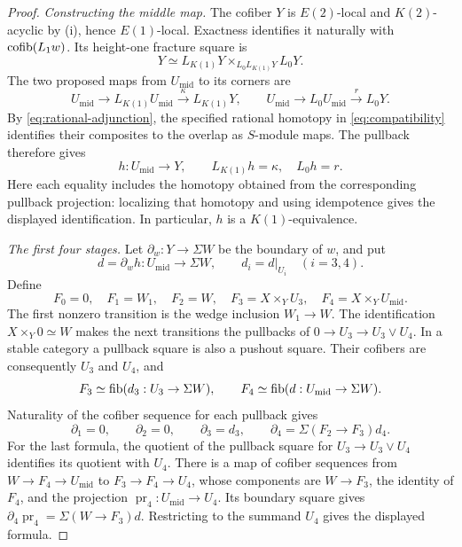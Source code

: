 \begin{proof}
\emph{Constructing the middle map.}
The cofiber \(Y\) is \(E(2)\)-local and \(K(2)\)-acyclic by
\textup{(i)}, hence \(E(1)\)-local.  Exactness identifies it
naturally with \(\operatorname{cofib}(L_1w)\).  Its height-one fracture square is
\[
 Y\simeq L_{K(1)}Y\mathbin{\times}_{L_0L_{K(1)}Y}L_0Y.
\]
The two proposed maps from \(U_{\mathrm{mid}}\) to its corners are
\[
 U_{\mathrm{mid}}\longrightarrow L_{K(1)}U_{\mathrm{mid}}\xrightarrow{\kappa}L_{K(1)}Y,
 \qquad
 U_{\mathrm{mid}}\longrightarrow L_0U_{\mathrm{mid}}\xrightarrow rL_0Y.
\]
By \eqref{eq:rational-adjunction}, the specified rational homotopy
in \eqref{eq:compatibility} identifies their composites to the
overlap as \(S\)-module maps.  The pullback therefore gives
\begin{equation}\label{eq:middle-map}
 h:U_{\mathrm{mid}}\longrightarrow Y,\qquad L_{K(1)}h=\kappa,\quad L_0h=r.
\end{equation}
Here each equality includes the homotopy obtained from the
corresponding pullback projection: localizing that homotopy and
using idempotence gives the displayed identification.  In
particular, \(h\) is a \(K(1)\)-equivalence.

\emph{The first four stages.}
Let \(\partial_w:Y\to\Sigma W\) be the boundary of \(w\), and put
\[
 d=\partial_wh:U_{\mathrm{mid}}\longrightarrow\Sigma W,\qquad
 d_i=d|_{U_i}\quad(i=3,4).
\]
Define
\begin{equation}\label{eq:first-stages}
 F_0=0,\quad F_1=W_1,\quad F_2=W,\quad
 F_3=X\mathbin{\times}_YU_3,\quad
 F_4=X\mathbin{\times}_YU_{\mathrm{mid}}.
\end{equation}
The first nonzero transition is the wedge inclusion \(W_1\to W\).
The identification \(X\times_Y0\simeq W\) makes the next transitions
the pullbacks of \(0\to U_3\to U_3\vee U_4\).
In a stable category a pullback square is also a pushout square.
Their cofibers are consequently \(U_3\) and \(U_4\), and
\[
 F_3\simeq\operatorname{fib}(d_3:U_3\to\Sigma W),\qquad
 F_4\simeq\operatorname{fib}(d:U_{\mathrm{mid}}\to\Sigma W).
\]
Naturality of the cofiber sequence for each pullback gives
\begin{equation}\label{eq:first-boundaries}
 \partial_1=0,\qquad \partial_2=0,\qquad
 \partial_3=d_3,\qquad
 \partial_4=\Sigma(F_2\to F_3)d_4.
\end{equation}
For the last formula, the quotient of the pullback square for
\(U_3\to U_3\vee U_4\) identifies its quotient with \(U_4\).
There is a map of cofiber sequences from
\(W\to F_4\to U_{\mathrm{mid}}\) to
\(F_3\to F_4\to U_4\), whose components are
\(W\to F_3\), the identity of \(F_4\), and the projection
\(\operatorname{pr}_4:U_{\mathrm{mid}}\to U_4\).
Its boundary square gives
\(\partial_4\operatorname{pr}_4=\Sigma(W\to F_3)d\).
Restricting to the summand \(U_4\) gives the displayed formula.


\end{proof}
